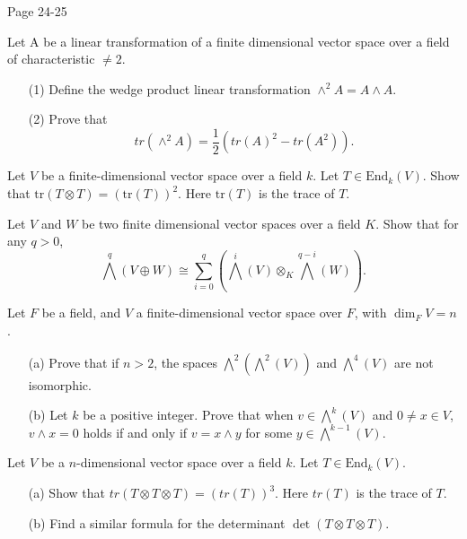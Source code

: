 Page 24-25

\begin{prob}[F2016-Q5]
    Let A be a linear transformation of a finite dimensional vector space over a field of characteristic \(\neq 2\).
    \begin{itemize}
        \item[(1)] Define the wedge product linear transformation \(\wedge^{2}A=A\wedge A\).
        \item[(2)] Prove that
        \[tr(\wedge^{2}A)=\frac{1}{2}(tr(A)^{2}-tr(A^{2})).\]
    \end{itemize}
\end{prob}


\begin{prob}[S2006-Q5]
    Let \(V\) be a finite-dimensional vector space over a field \(k\). Let \(T \in \text{End}_k(V)\). Show that \(\text{tr}(T \otimes T) = (\text{tr}(T))^2\). Here \(\text{tr}(T)\) is the trace of \(T\).
\end{prob}

\begin{prob}[S2016-Q4]
    Let \(V\) and \(W\) be two finite dimensional vector spaces over a field \(K\). Show that for any \(q>0\),
    \[\bigwedge^{q}(V\oplus W)\cong\sum_{i=0}^{q}(\bigwedge^{i}(V)\otimes_{K}\bigwedge^{q-i}(W)).\]
\end{prob}



\begin{prob}[S2011-Q4]
    Let \(F\) be a field, and \(V\) a finite-dimensional vector space over \(F\), with \(\dim_F V=n\).
    \begin{itemize}
        \item[(a)] Prove that if \(n>2\), the spaces \(\bigwedge^2(\bigwedge^2(V))\) and \(\bigwedge^4(V)\) are not isomorphic.
        \item[(b)] Let \(k\) be a positive integer. Prove that when \(v\in\bigwedge^k(V)\) and \(0\neq x\in V\), \(v\wedge x=0\) holds if and only if \(v=x\wedge y\) for some \(y\in\bigwedge^{k-1}(V)\).
    \end{itemize}
\end{prob}


\begin{prob}[S2010-Q4]
    Let \(V\) be a \(n\)-dimensional vector space over a field \(k\). Let \(T \in \text{End}_k(V)\).
    \begin{itemize}
        \item[(a)] Show that \(tr(T \otimes T \otimes T) = (tr(T))^3\). Here \(tr(T)\) is the trace of \(T\).
        \item[(b)] Find a similar formula for the determinant \(\det(T \otimes T \otimes T)\).
    \end{itemize}
\end{prob}








